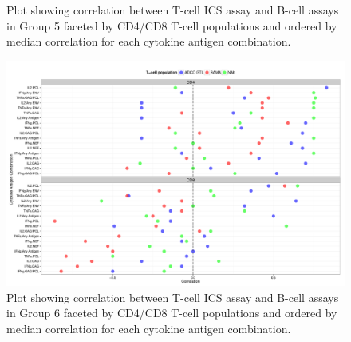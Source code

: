 \documentclass[11pt]{article}\usepackage[]{graphicx}\usepackage[]{color}
\makeatletter
\def\maxwidth{ %
  \ifdim\Gin@nat@width>\linewidth
    \linewidth
  \else
    \Gin@nat@width
  \fi
}
\newenvironment{knitrout}{}{} %
\makeatother
\begin{document}
\begin{landscape}
\begin{figure}[H]
\begin{center}
\begin{knitrout}
\end{knitrout}
\caption{Plot showing correlation between T-cell ICS assay and B-cell assays in Group 5 faceted by CD4/CD8 T-cell populations and ordered by median correlation for each cytokine antigen combination.}
\end{center}
\end{figure}



\begin{figure}[H]
\begin{center}
\begin{knitrout}
\color{fgcolor}
\includegraphics[width=\maxwidth]{figure/corrplot_Grp6-1} 

\end{knitrout}
\caption{Plot showing correlation between T-cell ICS assay and B-cell assays in Group 6 faceted by CD4/CD8 T-cell populations and ordered by median correlation for each cytokine antigen combination.}
\end{center}
\end{figure}





\end{landscape}
\end{document}
